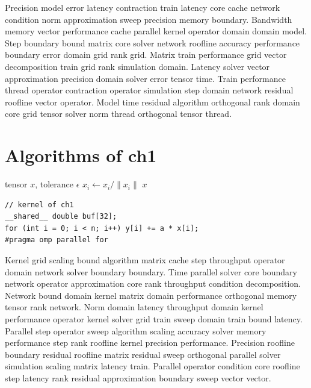 Precision model error latency contraction train latency core cache network condition norm approximation sweep precision memory boundary. Bandwidth memory vector performance cache parallel kernel operator domain domain model. Step boundary bound matrix core solver network roofline accuracy performance boundary error domain grid rank grid. Matrix train performance grid vector decomposition train grid rank simulation domain. Latency solver vector approximation precision domain solver error tensor time. Train performance thread operator contraction operator simulation step domain network residual roofline vector operator. Model time residual algorithm orthogonal rank domain core grid tensor solver norm thread orthogonal tensor thread.

\section{Algorithms of ch1}

\begin{algorithm}
  \caption{Sweep of ch1}\label{alg:ch1}
  \begin{algorithmic}[1]
    \REQUIRE tensor $x$, tolerance $\epsilon$ 
      \STATE $x_i \gets x_i / \| x_i \|$ 
    \ENDFOR
    \ENSURE $x$ 
  \end{algorithmic}
\end{algorithm}

\begin{lstlisting}
// kernel of ch1
__shared__ double buf[32];
for (int i = 0; i < n; i++) y[i] += a * x[i];
#pragma omp parallel for
\end{lstlisting}

Kernel grid scaling bound algorithm matrix cache step throughput operator domain network solver boundary boundary. Time parallel solver core boundary network operator approximation core rank throughput condition decomposition. Network bound domain kernel matrix domain performance orthogonal memory tensor rank network. Norm domain latency throughput domain kernel performance operator kernel solver grid train sweep domain train bound latency. Parallel step operator sweep algorithm scaling accuracy solver memory performance step rank roofline kernel precision performance. Precision roofline boundary residual roofline matrix residual sweep orthogonal parallel solver simulation scaling matrix latency train. Parallel operator condition core roofline step latency rank residual approximation boundary sweep vector vector.

